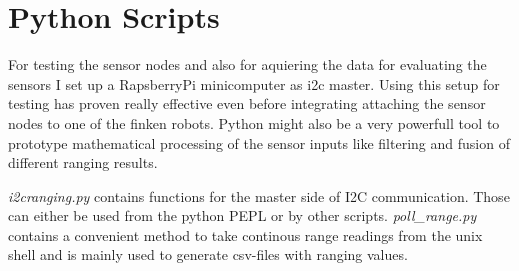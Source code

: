 \section{Python Scripts}

For testing the sensor nodes and also for aquiering the data for evaluating the sensors I set up a RapsberryPi minicomputer as i2c master.
Using this setup for testing has proven really effective even before integrating attaching the sensor nodes to one of the finken robots.
Python might also be a very powerfull tool to prototype mathematical processing of the sensor inputs like filtering and fusion of different ranging results.

\emph{i2cranging.py} contains functions for the master side of I2C communication. Those can either be used from the python PEPL or by other scripts.
\emph{poll\_range.py} contains a convenient method to take continous range readings from the unix shell and is mainly used to generate csv-files with ranging values.
